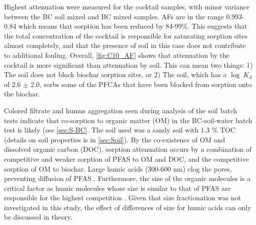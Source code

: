 Highest attenuation were measured for the cocktail samples, with minor variance between the BC soil mixed and BC mixed samples. AFs are in the range 0.993-0.84 which means that sorption has been reduced by 84-99\%. This suggests that the total concentration of the cocktail is responsible for saturating sorption sites almost completely, and that the presence of soil in this case does not contribute to additional fouling. Overall, \cref{fig:C10_AF} shows that attenuation by the cocktail is more significant than attenuation by soil. This can mean two things: 1) The soil does not block biochar sorption sites, or 2) The soil, which has a $\log~K_d$ of 2.6 $\pm$ 2.0, sorbs some of the PFCAs that have been blocked from sorption onto the biochar. 

Colored filtrate and humus aggregation seen during analysis of the soil batch tests indicate that co-sorption to organic matter (OM) in the BC-soil-water batch test is likely (see \cref{sec:S-BC}. The soil used was a sandy soil with 1.3 \% TOC (details on soil properties is in \cref{sec:Soil}). By the co-existence of OM and dissolved organic carbon (DOC), sorption attenuation occurs by a combination of competitive and weaker sorption of PFAS to OM and DOC, and the competitive sorption of OM to biochar. Large humic acids (300-600 nm) clog the pores, preventing diffusion of PFAS \citep{Cornelissen2006,kluvcakova2018size}. Furthermore, the size of the organic molecules is a critical factor as humic molecules whose size is similar to that of PFAS are responsible for the highest competition \citep{du2014adsorption}. Given that size fractionation was not investigated in this study, the effect of differences of size for humic acids can only be discussed in theory.

